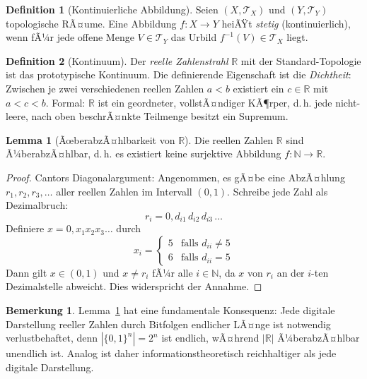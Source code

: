 ﻿\documentclass[a4paper,12pt]{article}
\theoremstyle{definition}
\newtheorem{definition}{Definition}
\newtheorem{lemma}{Lemma}
\newtheorem{bemerkung}{Bemerkung}
\begin{document}
\begin{definition}[Kontinuierliche Abbildung]
Seien $(X,\mathcal{T}_X)$ und $(Y,\mathcal{T}_Y)$ topologische RÃ¤ume.
Eine Abbildung $f: X \to Y$ heiÃŸt \emph{stetig} (kontinuierlich), wenn fÃ¼r jede offene
Menge $V \in \mathcal{T}_Y$ das Urbild $f^{-1}(V) \in \mathcal{T}_X$ liegt.
\end{definition}

\begin{definition}[Kontinuum]
Der \emph{reelle Zahlenstrahl} $\mathbb{R}$ mit der Standard-Topologie ist das
prototypische Kontinuum.  Die definierende Eigenschaft ist die
\emph{Dichtheit}: Zwischen je zwei verschiedenen reellen Zahlen $a < b$
existiert ein $c \in \mathbb{R}$ mit $a < c < b$.
Formal: $\mathbb{R}$ ist ein geordneter, vollstÃ¤ndiger KÃ¶rper, d.\,h. jede
nicht-leere, nach oben beschrÃ¤nkte Teilmenge besitzt ein Supremum.
\end{definition}

\begin{lemma}[ÃœberabzÃ¤hlbarkeit von $\mathbb{R}$]
\label{lem:ueberabzaehlbar}
Die reellen Zahlen $\mathbb{R}$ sind Ã¼berabzÃ¤hlbar, d.\,h. es existiert keine
surjektive Abbildung $f: \mathbb{N} \to \mathbb{R}$.
\end{lemma}

\begin{proof}
Cantors Diagonalargument: Angenommen, es gÃ¤be eine AbzÃ¤hlung
$r_1, r_2, r_3, \ldots$ aller reellen Zahlen im Intervall $(0,1)$.
Schreibe jede Zahl als Dezimalbruch:
\[
r_i = 0{,}d_{i1}\, d_{i2}\, d_{i3}\, \ldots
\]
Definiere $x = 0{,}x_1 x_2 x_3 \ldots$ durch
\[
x_i = \begin{cases} 5 & \text{falls } d_{ii} \neq 5 \\ 6 & \text{falls } d_{ii} = 5 \end{cases}
\]
Dann gilt $x \in (0,1)$ und $x \neq r_i$ fÃ¼r alle $i \in \mathbb{N}$, da $x$ von $r_i$
an der $i$-ten Dezimalstelle abweicht.  Dies widerspricht der Annahme.
\end{proof}

\begin{bemerkung}
Lemma~\ref{lem:ueberabzaehlbar} hat eine fundamentale Konsequenz:
Jede digitale Darstellung reeller Zahlen durch Bitfolgen endlicher LÃ¤nge ist notwendig
verlustbehaftet, denn $|\{0,1\}^n| = 2^n$ ist endlich, wÃ¤hrend $|\mathbb{R}|$ Ã¼berabzÃ¤hlbar
unendlich ist.  Analog ist daher informationstheoretisch reichhaltiger als jede digitale
Darstellung.
\end{bemerkung}
\end{document}
